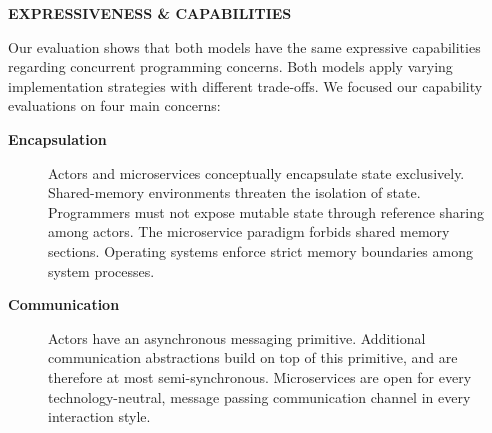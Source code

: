 \documentclass[final,hyperref={pdfpagelabels=true}]{beamer}
\newcommand{\sectionlinetwo}[2]{%
  \nointerlineskip 
  \vspace{.5\baselineskip}
  \hspace{\fill}
  {\color{#1}
    \resizebox{.2\linewidth}{2.5ex}
    {{%
    {\begin{tikzpicture}
    \node (C) at (0,0) {};
    \node (D) at (9,0) {};
    \path (C) to [ornament=#2] (D);
    \end{tikzpicture}}}}}%
    \hspace{\fill}
    \par\nointerlineskip \vspace{.5\baselineskip}
  }
\begin{document}
\begin{frame}
  
  \begin{columns}[t]
    \begin{column}{.04\textwidth}
      \end{column}
    \begin{column}{.43\textwidth}
      \textsf{\textbf{EXPRESSIVENESS \& CAPABILITIES}} \\
      \vspace*{.5\baselineskip}
      {\lmodern
        \begin{justify}
        Our evaluation shows that both models have the same expressive capabilities regarding concurrent programming concerns. Both models apply varying implementation strategies with different trade-offs. We focused our capability evaluations on four main concerns:
        \end{justify}
        
        \vspace*{\baselineskip}

        \renewcommand\sfdefault{lmss} %

        \begin{description}
          \item[\textbf{\textsf{Encapsulation}}] 
          \begin{justify}
          Actors and microservices conceptually encapsulate state exclusively. Shared-memory environments threaten the isolation of state. Programmers must not expose mutable state through reference sharing among actors. The microservice paradigm forbids shared memory sections. Operating systems enforce strict memory boundaries among system processes.
          \end{justify}

          \vspace*{1.5\baselineskip}

          \item[\textbf{\textsf{Communication}}] 
          \begin{justify}
          Actors have an asynchronous messaging primitive. Additional communication abstractions build on top of this primitive, and are therefore at most semi-synchronous. Microservices are open for every technology-neutral, message passing communication channel in every interaction style.
          \end{justify}


\end{description}}
\end{column}
\end{columns}
\end{frame}
\end{document}
